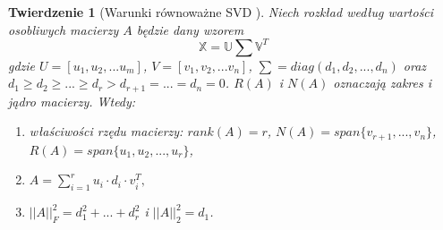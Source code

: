 \documentclass[12pt,a4paper]{report}
\newtheorem{tw}[df]{Twierdzenie}
\begin{document}
\begin{tw}[Warunki równoważne SVD {\citep{ulafiir}}]%
Niech rozkład według wartości osobliwych macierzy $A$ będzie dany wzorem
$$
\mathbb{X}=\mathbb{U}\sum \mathbb{V}^T
$$
gdzie $U=[u_1,u_2,...u_m]$, $V = [v_1,v_2,...v_n]$, $\sum = diag(d_1, d_2,..., d_n)$ oraz 
$d_1\geq d_2 \geq ... \geq d_r > d_{r+1} = ... = d_n = 0$.
$R(A)$ i $N(A)$ oznaczają zakres i jądro macierzy.
Wtedy:
\begin{enumerate}
\item właściwości rzędu macierzy: $rank(A) = r$, $N(A) = span\{v_{r+1},...,v_n \}$, 
$R(A) = span \{u_1,u_2,...,u_r \}$,
\item $A = \sum_{i=1}^r u_i \cdot d_i \cdot v_i^T,$
\item $||A||_F^2 = d_1^2+...+d_r^2$ i $||A||_2^2 = d_1$.
\end{enumerate}
\end{tw}
\end{document}
